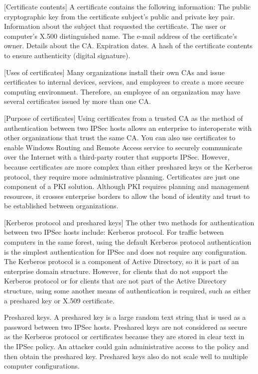 \documentclass[conference, compsoc]{IEEEtran}
\begin{document}
	[Certificate contents]
A certificate contains the following information:
The public cryptographic key from the certificate subject’s public and private key pair.
Information about the subject that requested the certificate.
The user or computer’s X.500 distinguished name.
The e-mail address of the certificate’s owner.
Details about the CA.
Expiration dates.
A hash of the certificate contents to ensure authenticity (digital signature).

	[Uses of certificates]
Many organizations install their own CAs and issue certificates to internal devices, services, and employees to create a more secure computing environment. Therefore, an employee of an organization may have several certificates issued by more than one CA.

	[Purpose of certificates]
Using certificates from a trusted CA as the method of authentication between two IPSec hosts allows an enterprise to interoperate with other organizations that trust the same CA. You can also use certificates to  enable Windows Routing and Remote Access service to securely communicate over the Internet with a third-party router that supports IPSec. However, because certificates are more complex than either preshared keys or the Kerberos protocol, they require more administrative planning. Certificates are just one component of a PKI solution. Although PKI requires planning and management resources, it crosses enterprise borders to allow the bond of identity and trust to be established between organizations.

	[Kerberos protocol and preshared keys]
The other two methods for authentication between two IPSec hosts include:
Kerberos protocol. For traffic between computers in the same forest, using the default Kerberos protocol authentication is the simplest authentication for IPSec and does not require any configuration. The Kerberos protocol is a component of Active Directory, so it is part of an enterprise domain structure. However, for clients that do not support the Kerberos protocol or for clients that are not part of the Active Directory structure, using some another means of authentication is required, such as either a preshared key or X.509 certificate.

Preshared keys. A preshared key is a large random text string that is used as a password between two IPSec hosts. Preshared keys are not considered as secure as the Kerberos protocol or certificates because they are stored in clear text in the IPSec policy. An attacker could gain administrative access to the policy and then obtain the preshared key. Preshared keys also do not scale well to multiple computer configurations.
\end{document}
